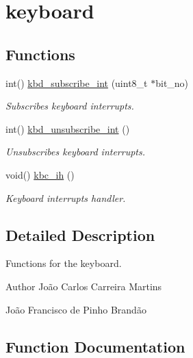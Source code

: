 \hypertarget{group__keyboard}{}\section{keyboard}
\label{group__keyboard}
\subsection*{Functions}
\begin{DoxyCompactItemize}
\item 
int() \hyperlink{group__keyboard_ga4ac9231a99a664d6a9f0b69767e0d707}{kbd\+\_\+subscribe\+\_\+int} (uint8\+\_\+t $\ast$bit\+\_\+no)
\begin{DoxyCompactList}\small\item\em Subscribes keyboard interrupts. \end{DoxyCompactList}\item 
int() \hyperlink{group__keyboard_gaee0a7b54ee426fade9c780418d110fe0}{kbd\+\_\+unsubscribe\+\_\+int} ()
\begin{DoxyCompactList}\small\item\em Unsubscribes keyboard interrupts. \end{DoxyCompactList}\item 
void() \hyperlink{group__keyboard_gaea970a154161a35f6894898a092ed70a}{kbc\+\_\+ih} ()
\begin{DoxyCompactList}\small\item\em Keyboard interrupts handler. \end{DoxyCompactList}\end{DoxyCompactItemize}


\subsection{Detailed Description}
Functions for the keyboard.

\begin{DoxyAuthor}{Author}
João Carlos Carreira Martins 

João Francisco de Pinho Brandão 
\end{DoxyAuthor}


\subsection{Function Documentation}
\mbox{\label{group__keyboard_gaea970a154161a35f6894898a092ed70a}} 
